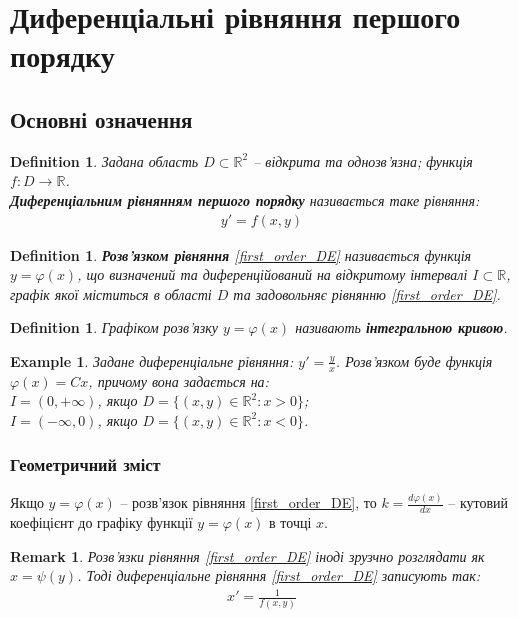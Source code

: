 \documentclass[a4paper, 10pt]{article}
\theoremstyle{theoremdd}
\theoremstyle{theoremdd}
\newtheorem{definition}[theorem]{Definition}
\theoremstyle{theoremdd}
\theoremstyle{theoremdd}
\newtheorem{example}[theorem]{Example}
\theoremstyle{theoremdd}
\theoremstyle{theoremdd}
\newtheorem{remark}[theorem]{Remark}
\theoremstyle{theoremdd}
\theoremstyle{theoremdd}
\begin{document}
\tableofcontents
\newpage
    	
	\section{Диференціальні рівняння першого порядку}
	\subsection{Основні означення}
	\begin{definition}
 Задана область $D \subset \mathbb{R}^2$ -- відкрита та однозв'язна; функція $f\colon D \to \mathbb{R}$.\\
	\textbf{Диференціальним рівнянням першого порядку} називається таке рівняння:
	\begin{align}
	\label{first_order_DE}
	y' = f(x,y)
	\end{align}
	\end{definition}

	\begin{definition}
 \textbf{Розв'язком рівняння} \eqref{first_order_DE} називається функція $y = \varphi(x)$, що визначений та диференційований на відкритому інтервалі $I \subset \mathbb{R}$, графік якої міститься в області $D$ та задовольняє рівнянню \eqref{first_order_DE}.
 	\end{definition}
 	
	\begin{definition}
	Графіком розв'язку $y = \varphi(x)$ називають \textbf{інтегральною кривою}.
	\end{definition}
	
	\begin{example}
 	Задане диференціальне рівняння: $\displaystyle y' = \frac{y}{x}$. Розв'язком буде функція $\varphi(x)=Cx$, причому вона задається на:\\
	$I=(0, +\infty)$, якщо $D=\{(x,y) \in \mathbb{R}^2: x>0\}$;\\
	$I=(-\infty, 0)$, якщо $D=\{(x,y) \in \mathbb{R}^2: x<0\}$.
	\end{example}
	
	\subsubsection*{Геометричний зміст}
	Якщо $y=\varphi(x)$ -- розв'язок рівняння \eqref{first_order_DE}, то $\displaystyle k = \frac{d\varphi(x)}{dx}$ -- кутовий коефіцієнт до графіку функції $y=\varphi(x)$ в точці $x$.
	
	\begin{remark}
 	Розв'язки рівняння \eqref{first_order_DE} іноді зрузчно розглядати як $x=\psi(y)$. Тоді диференціальне рівняння \eqref{first_order_DE} записують так:
	\begin{align*}
	x'=\frac{1}{f(x,y)}
	\end{align*}
	\end{remark}
	
\end{document}
